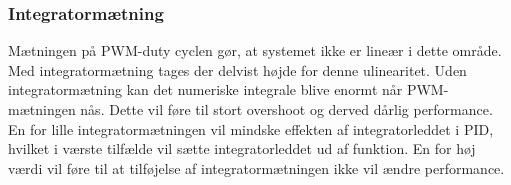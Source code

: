 \subsubsection{Integratormætning}
Mætningen på PWM-duty cyclen gør, at systemet ikke er lineær i dette område. Med integratormætning 
tages der delvist højde for denne ulinearitet. Uden integratormætning kan det numeriske integrale blive enormt når 
PWM-mætningen nås. Dette vil føre til stort overshoot og derved dårlig 
performance. 
En for lille integratormætningen vil mindske effekten af integratorleddet i PID, 
hvilket i værste tilfælde vil sætte integratorleddet ud af funktion.
En for høj værdi vil føre til at tilføjelse af integratormætningen ikke vil ændre 
performance.



